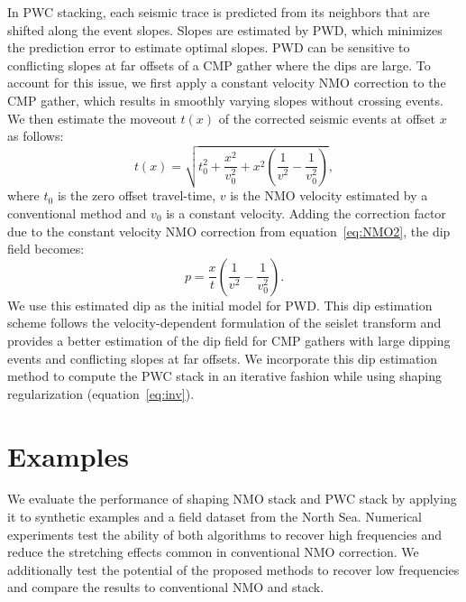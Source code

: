 
In PWC stacking, each seismic trace is predicted from its neighbors that are shifted 
along the event slopes. Slopes are estimated by PWD, which minimizes the prediction error to estimate optimal slopes.
PWD can be sensitive to conflicting slopes at far offsets of a CMP gather where the dips are large.
To account for this issue, we first apply a constant velocity NMO correction to the CMP gather, which results in 
smoothly varying slopes without crossing events. 
We then estimate the moveout $t(x)$ of the corrected seismic events at offset $x$ as follows:
\begin{equation} 
\label{eq:NMO2}
t(x) = \sqrt{t_{0}^{2}+\frac{x^{2}}{v_{0}^{2}} + x^{2} \left(\frac{1}{v^{2}} - \frac{1}{v_{0}^{2}}\right)},
\end{equation}
where $t_0$ is the zero offset travel-time, $v$ is the NMO velocity estimated by a conventional method 
and $v_0$ is a constant velocity. Adding the correction factor due to the constant velocity NMO correction 
from equation~\ref{eq:NMO2}, the dip field becomes:
\begin{equation} 
\label{eq:dip2}
p={\frac{x}{t}}\left(\frac{1}{v^{2}}-\frac{1}{v_{0}^{2}}\right).
\end{equation}
We use this estimated dip as the initial model for PWD. 
This dip estimation scheme follows the velocity-dependent formulation of the seislet transform \cite[]{liu}
and provides a better estimation of the dip field for CMP gathers with large dipping events and conflicting slopes at 
far offsets. We incorporate this dip estimation method to compute the PWC stack in an iterative 
fashion while using shaping regularization (equation~\ref{eq:inv}).

\section{Examples}
We evaluate the performance of shaping NMO stack and PWC stack by applying it to synthetic examples and a field dataset 
from the North Sea. Numerical experiments test the ability of both algorithms to recover high frequencies and
reduce the stretching effects common in conventional NMO correction. We additionally test the potential of the proposed
methods to recover low frequencies and compare the results to conventional NMO and stack.

